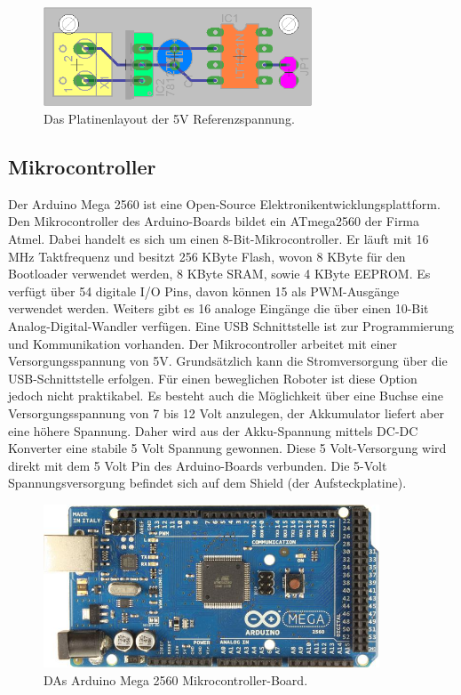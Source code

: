 \documentclass[a4paper,bibtotoc,oneside]{scrbook}
\begin{document}
\begin{figure}[htbp]
\centering
\includegraphics[width=80mm]{img/refu2.png}
\caption{Das Platinenlayout der 5V Referenzspannung.}\label{refu2}
\end{figure}

 
\subsection{Mikrocontroller}\thispagestyle{empty}
Der Arduino Mega 2560 ist eine Open-Source Elektronikentwicklungsplattform. Den Mikrocontroller des Arduino-Boards bildet ein ATmega2560 der Firma Atmel. Dabei handelt es sich um einen 8-Bit-Mikrocontroller.  Er läuft mit 16 MHz Taktfrequenz und besitzt 256 KByte Flash, wovon 8 KByte für den Bootloader verwendet werden, 8 KByte SRAM, sowie 4 KByte EEPROM.  Es verfügt über 54 digitale I/O Pins, davon können 15 als PWM-Ausgänge verwendet werden. Weiters gibt es 16 analoge Eingänge die über einen 10-Bit Analog-Digital-Wandler verfügen.
Eine USB Schnittstelle ist zur Programmierung und Kommunikation vorhanden.
Der Mikrocontroller arbeitet mit einer Versorgungsspannung von 5V.
Grundsätzlich kann die Stromversorgung über die USB-Schnittstelle erfolgen. Für einen beweglichen Roboter ist diese Option jedoch nicht praktikabel. Es besteht auch die Möglichkeit über eine Buchse eine Versorgungsspannung von 7 bis 12 Volt anzulegen, der Akkumulator liefert aber eine höhere Spannung. 
Daher wird aus der Akku-Spannung mittels DC-DC Konverter eine stabile 5 Volt Spannung gewonnen. Diese 5 Volt-Versorgung wird direkt mit dem 5 Volt Pin des Arduino-Boards verbunden. Die 5-Volt Spannungsversorgung befindet sich auf dem Shield (der Aufsteckplatine).

\begin{figure}[htbp]
\centering
\includegraphics[width=100mm]{img/ArduinoMega2.jpg}
\caption[Arduino Mega 2560]{DAs Arduino Mega 2560 Mikrocontroller-Board.}\label{ardu}
\end{figure}
\end{document}
